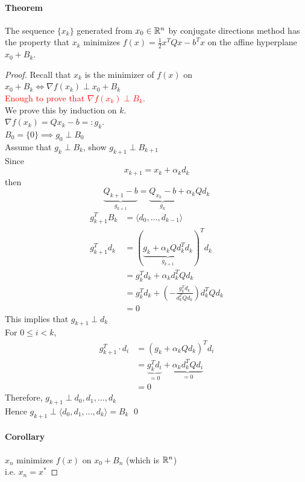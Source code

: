 \documentclass[11pt]{article}
\begin{document}
\paragraph{Theorem}
The sequence $\{x_k\}$ generated from $x_0 \in \mathbb{R}^n$ by conjugate directions method has the property that $x_k$ minimizes $f(x) = \frac{1}{2}x^TQx - b^Tx$ on the affine hyperplane $x_0 + B_k$. \\
\begin{proof}
	Recall that $x_k$ is the minimizer of $f(x)$ on $x_0 + B_k \iff \nabla f(x_k) \perp x_0 + B_k$ \\
	\textcolor{red}{Enough to prove that $\nabla f(x_k) \perp B_k$.} \\
	We prove this by induction on $k$. \\
	 $\nabla f(x_k) = Q x_k - b =: g_k$. \\
	 $B_0 = \{0\} \implies g_0 \perp B_0$ \\
	 Assume that $g_k \perp B_k$, show $g_{k+1} \perp B_{k+1}$ \\
	Since $$x_{k+1} = x_k + \alpha_k d_k$$
	then $$\underbrace{Q_{k+1} - b}_{g_{k+1}} = \underbrace{Q_{x_k} - b}_{g_k} + \alpha_k Q d_k$$
\begin{align}
	g_{k+1}^TB_k &= \langle d_0, \hdots, d_{k-1} \rangle \\
	g_{k+1}^Td_k &= (\underbrace{g_k + \alpha_k Q d_k^T d_k}_{g_{k+1}})^Td_k \\
	&= g_k^Td_k + \alpha_k d_k^T Q d_k \\
	&= g_k^Td_k + (- \frac{g_k^Td_k}{d_k^TQd_k})d_k^TQd_k \\
	&= 0
\end{align}
This implies that $g_{k+1} \perp d_k$ \\
For $0 \leq i < k$, 
\begin{align}
g_{k+1}^T\cdot d_i &= (g_k + \alpha_k Q d_k)^T d_i \\
&= \underbrace{g_k^Td_i}_{= 0} + \underbrace{\alpha_k d_k^T Q d_i}_{= 0} \\
&= 0	
\end{align}
Therefore, $g_{k+1} \perp d_0, d_1, \hdots, d_k$\\
Hence $g_{k+1} \perp \langle d_0, d_1, \hdots, d_k \rangle = B_k$
\qed 

\paragraph{Corollary} $x_n$ minimizes $f(x)$ on $x_0 + B_n$ (which is $\mathbb{R}^n$) \\
i.e. $x_n = x^*$ 

\end{proof}
\end{document}
